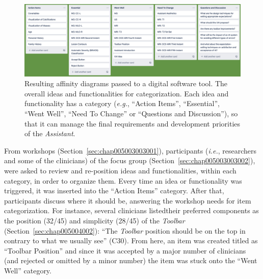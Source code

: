 
\begin{figure}[htbp]
\centering
\includegraphics[width=\columnwidth]{images/fig039}
\caption{Resulting affinity diagrams passed to a digital software tool. The overall ideas and functionalities for categorization. Each idea and functionality has a category ({\it e.g.}, ``Action Items'', ``Essential'', ``Went Well'', ``Need To Change'' or ``Questions and Discussion''), so that it can manage the final requirements and development priorities of the {\it Assistant}.}
\label{fig:fig039}
\end{figure}

From workshops (Section~\ref{sec:chap005003003001}), participants ({\it i.e.}, researchers and some of the clinicians) of the focus group (Section~\ref{sec:chap005003003002}), were asked to review and re-position ideas and functionalities, within each category, in order to organize them.
Every time an idea or functionality was triggered, it was inserted into the ``Action Items'' category.
After that, participants discuss where it should be, answering the workshop needs for item categorization.
For instance, several clinicians listed\footnotemark[8] their preferred components as the position (32/45) and simplicity (28/45) of the {\it Toolbar} (Section~\ref{sec:chap005004002}):
``The {\it Toolbar} position should be on the top in contrary to what we usually see'' (C30).
From here, an item was created titled as ``Toolbar Position'' and since it was accepted by a major number of clinicians (and rejected or omitted by a minor number) the item was stuck onto the ``Went Well'' category.

